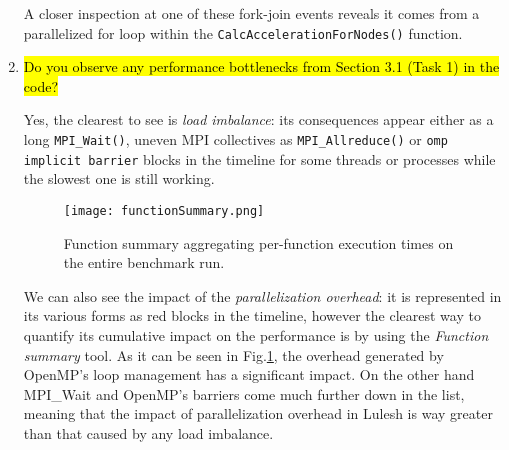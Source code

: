 \documentclass{article}
\begin{document}
\begin{enumerate}
	A closer inspection at one of these fork-join events reveals it comes from a parallelized for loop within the \verb!CalcAccelerationForNodes()! function.

	\item \hl{Do you observe any performance bottlenecks from Section 3.1 (Task 1) in the code?} ~

	Yes, the clearest to see is \emph{load imbalance}: its consequences appear either as a long \verb!MPI_Wait()!, uneven MPI collectives as \verb!MPI_Allreduce()! or \verb!omp implicit barrier! blocks in the timeline for some threads or processes while the slowest one is still working.

	\begin{figure}[p] %
		\begin{center}
			\texttt{[image: functionSummary.png]}
		\cprotect\caption{Function summary aggregating per-function execution times on the entire benchmark run.}
		\label{fig:functionSummary}
		\end{center}
	\end{figure}

	We can also see the impact of the \emph{parallelization overhead}: it is represented in its various forms as red blocks in the timeline, however the clearest way to quantify its cumulative impact on the performance is by using the \emph{Function summary} tool. As it can be seen in Fig.\ref{fig:functionSummary}, the overhead generated by OpenMP's loop management has a significant impact. On the other hand MPI\_Wait and OpenMP's barriers come much further down in the list, meaning that the impact of parallelization overhead in Lulesh is way greater than that caused by any load imbalance.
\end{enumerate}

\end{document}
